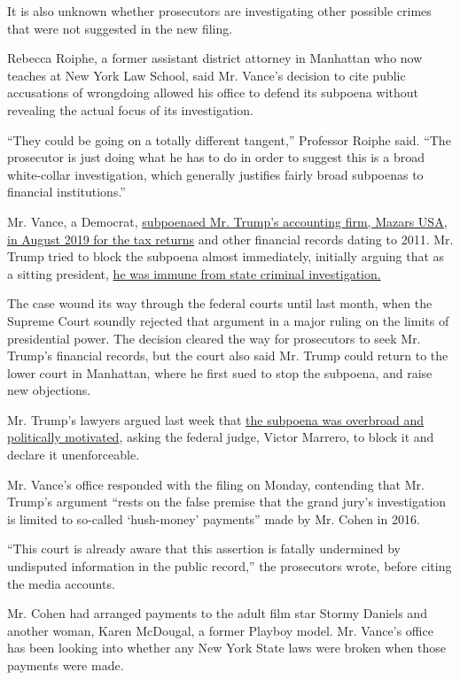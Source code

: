 It is also unknown whether prosecutors are investigating other possible
crimes that were not suggested in the new filing.

Rebecca Roiphe, a former assistant district attorney in Manhattan who
now teaches at New York Law School, said Mr. Vance's decision to cite
public accusations of wrongdoing allowed his office to defend its
subpoena without revealing the actual focus of its investigation.

``They could be going on a totally different tangent,'' Professor Roiphe
said. ``The prosecutor is just doing what he has to do in order to
suggest this is a broad white-collar investigation, which generally
justifies fairly broad subpoenas to financial institutions.''

Mr. Vance, a Democrat,
\href{https://www.nytimes3xbfgragh.onion/2019/09/16/nyregion/trump-tax-returns-cy-vance.html}{subpoenaed
Mr. Trump's accounting firm, Mazars USA, in August 2019 for the tax
returns} and other financial records dating to 2011. Mr. Trump tried to
block the subpoena almost immediately, initially arguing that as a
sitting president,
\href{https://www.nytimes3xbfgragh.onion/2019/09/19/nyregion/trump-tax-returns-lawsuit.html}{he
was immune from state criminal investigation.}

The case wound its way through the federal courts until last month, when
the Supreme Court soundly rejected that argument in a major ruling on
the limits of presidential power. The decision cleared the way for
prosecutors to seek Mr. Trump's financial records, but the court also
said Mr. Trump could return to the lower court in Manhattan, where he
first sued to stop the subpoena, and raise new objections.

Mr. Trump's lawyers argued last week that
\href{https://www.nytimes3xbfgragh.onion/2020/07/27/nyregion/donald-trump-taxes-cyrus-vance.html}{the
subpoena was overbroad and politically motivated}, asking the federal
judge, Victor Marrero, to block it and declare it unenforceable.

Mr. Vance's office responded with the filing on Monday, contending that
Mr. Trump's argument ``rests on the false premise that the grand jury's
investigation is limited to so-called `hush-money' payments'' made by
Mr. Cohen in 2016.

``This court is already aware that this assertion is fatally undermined
by undisputed information in the public record,'' the prosecutors wrote,
before citing the media accounts.

Mr. Cohen had arranged payments to the adult film star Stormy Daniels
and another woman, Karen McDougal, a former Playboy model. Mr. Vance's
office has been looking into whether any New York State laws were broken
when those payments were made.

